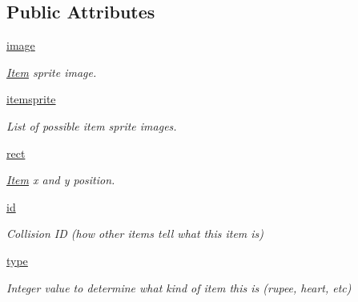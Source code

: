 \subsection*{Public Attributes}
\begin{DoxyCompactItemize}
\item 
\mbox{\label{classactor_1_1item_1_1_item_a2f2f0de31fa9a294bdf2c6070c43cf8a}} 
\hyperlink{classactor_1_1item_1_1_item_a2f2f0de31fa9a294bdf2c6070c43cf8a}{image}
\begin{DoxyCompactList}\small\item\em \hyperlink{classactor_1_1item_1_1_item}{Item} sprite image. \end{DoxyCompactList}\item 
\mbox{\label{classactor_1_1item_1_1_item_a0341980445d257f74dfc20208a93afd8}} 
\hyperlink{classactor_1_1item_1_1_item_a0341980445d257f74dfc20208a93afd8}{itemsprite}
\begin{DoxyCompactList}\small\item\em List of possible item sprite images. \end{DoxyCompactList}\item 
\mbox{\label{classactor_1_1item_1_1_item_aebbc33971d663fba6f5bd54e03a63813}} 
\hyperlink{classactor_1_1item_1_1_item_aebbc33971d663fba6f5bd54e03a63813}{rect}
\begin{DoxyCompactList}\small\item\em \hyperlink{classactor_1_1item_1_1_item}{Item} x and y position. \end{DoxyCompactList}\item 
\mbox{\label{classactor_1_1item_1_1_item_aee8f12aa657322ef895d9151dcc54e71}} 
\hyperlink{classactor_1_1item_1_1_item_aee8f12aa657322ef895d9151dcc54e71}{id}
\begin{DoxyCompactList}\small\item\em Collision ID (how other items tell what this item is) \end{DoxyCompactList}\item 
\mbox{\label{classactor_1_1item_1_1_item_ae65791520a3bdb6905e6e14a8b0abb3c}} 
\hyperlink{classactor_1_1item_1_1_item_ae65791520a3bdb6905e6e14a8b0abb3c}{type}
\begin{DoxyCompactList}\small\item\em Integer value to determine what kind of item this is (rupee, heart, etc) \end{DoxyCompactList}\end{DoxyCompactItemize}


